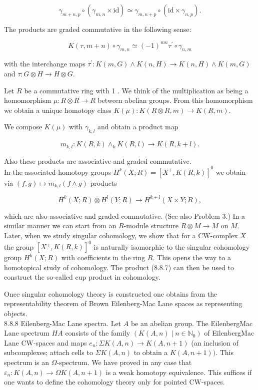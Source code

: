 \documentclass[10pt, letterpaper]{article}
\begin{document}
$$
\gamma_{m+n, p} \circ\left(\gamma_{m, n} \times \mathrm{id}\right) \simeq \gamma_{m, n+p} \circ\left(\mathrm{id} \times \gamma_{n, p}\right) .
$$

The products are graded commutative in the following sense:

$$
K(\tau, m+n) \circ \gamma_{m, n} \simeq(-1)^{m n} \tau^{\prime} \circ \gamma_{n, m}
$$

with the interchange maps $\tau^{\prime}: K(m, G) \wedge K(n, H) \rightarrow K(n, H) \wedge K(m, G)$ and $\tau: G \otimes H \rightarrow H \otimes G$.

Let $R$ be a commutative ring with 1 . We think of the multiplication as being a homomorphism $\mu: R \otimes R \rightarrow R$ between abelian groups. From this homomorphism we obtain a unique homotopy class $K(\mu): K(R \otimes R, m) \rightarrow K(R, m)$.

We compose $K(\mu)$ with $\gamma_{k, l}$ and obtain a product map

$$
m_{k, l}: K(R, k) \wedge_{k} K(R, l) \rightarrow K(R, k+l) .
$$

Also these products are associative and graded commutative.\\
In the associated homotopy groups $H^{k}(X ; R)=\left[X^{+}, K(R, k)\right]^{0}$ we obtain via $(f, g) \mapsto m_{k, l}(f \wedge g)$ products

$$
H^{k}(X ; R) \otimes H^{l}(Y ; R) \rightarrow H^{k+l}(X \times Y ; R),
$$

which are also associative and graded commutative. (See also Problem 3.) In a similar manner we can start from an $R$-module structure $R \otimes M \rightarrow M$ on $M$. Later, when we study singular cohomology, we show that for a CW-complex $X$ the group $\left[X^{+}, K(R, k)\right]^{0}$ is naturally isomorphic to the singular cohomology group $H^{k}(X ; R)$ with coefficients in the ring $R$. This opens the way to a homotopical study of cohomology. The product (8.8.7) can then be used to construct the so-called cup product in cohomology.

Once singular cohomology theory is constructed one obtains from the representability theorem of Brown Eilenberg-Mac Lane spaces as representing objects.\\
8.8.8 Eilenberg-Mac Lane spectra. Let $A$ be an abelian group. The EilenbergMac Lane spectrum $H A$ consists of the family $\left(K(A, n) \mid n \in \mathbb{N}_{0}\right)$ of EilenbergMac Lane CW-spaces and maps $e_{n}: \Sigma K(A, n) \rightarrow K(A, n+1)$ (an inclusion of\\
subcomplexes; attach cells to $\Sigma K(A, n)$ to obtain a $K(A, n+1))$. This spectrum is an $\Omega$-spectrum. We have proved in any case that $\varepsilon_{n}: K(A, n) \rightarrow \Omega K(A, n+1)$ is a weak homotopy equivalence. This suffices if one wants to define the cohomology theory only for pointed CW-spaces.
\end{document}
